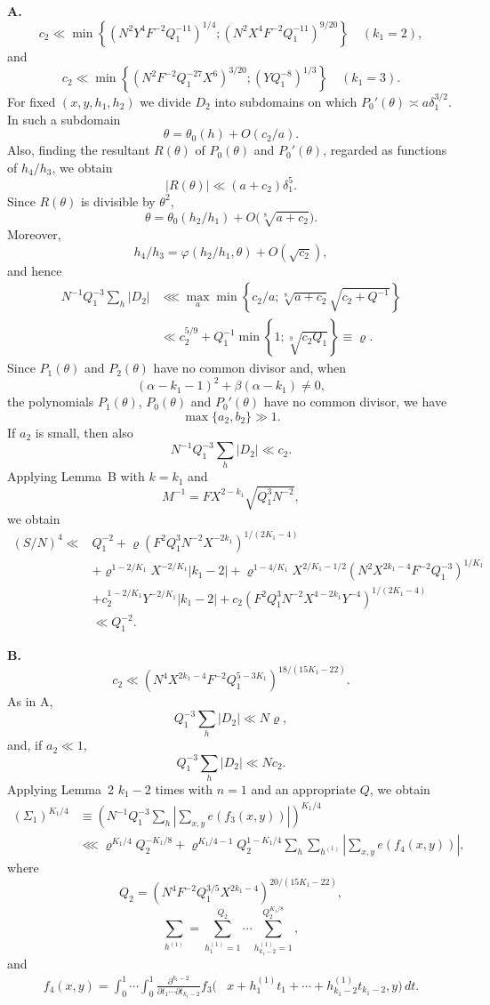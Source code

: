 \documentclass[10pt]{article}
\begin{document}
\medskip
\noindent\textbf{A.}
\[
 c_2\ll\min\left\{
 (N^2Y^4F^{-2}Q_1^{-11})^{1/4};
 (N^2X^4F^{-2}Q_1^{-11})^{9/20}
 \right\}\quad(k_1=2),
\]
and
\[
 c_2\ll\min\left\{
 (N^2F^{-2}Q_1^{-27}X^6)^{3/20};
 (YQ_1^{-8})^{1/3}
 \right\}\quad(k_1=3).
\]
For fixed $(x,y,h_1,h_2)$ we divide $D_2$ into subdomains on which
$P_0'(\theta)\asymp a\delta_1^{3/2}$. In such a subdomain
\[
  \theta=\theta_0(h)+O(c_2/a).
\]
Also, finding the resultant $R(\theta)$ of $P_0(\theta)$ and $P_0'(\theta)$, regarded as functions of $h_4/h_3$, we obtain
\[
  \lvert R(\theta)\rvert\ll(a+c_2)\delta_1^5.
\]
Since $R(\theta)$ is divisible by $\theta^2$,
\[
  \theta=\theta_0(h_2/h_1)+O\bigl(\sqrt[8]{a+c_2}\bigr).
\]
Moreover,
\[
  h_4/h_3=\varphi(h_2/h_1,\theta)+O(\sqrt{c_2}),
\]
and hence
\[
\begin{aligned}
N^{-1}Q_1^{-3}\sum_h\lvert D_2\rvert
&\lll \max_a\min\left\{
  c_2/a;
  \sqrt[8]{a+c_2}\sqrt{c_2+Q^{-1}}
 \right\}\\
&\ll c_2^{5/9}+Q_1^{-1}\min\left\{1;\sqrt[9]{c_2Q_1}\right\}
 \equiv\varrho.
\end{aligned}
\]
Since $P_1(\theta)$ and $P_2(\theta)$ have no common divisor and, when
\[
  (\alpha-k_1-1)^2+\beta(\alpha-k_1)\ne0,
\]
the polynomials $P_1(\theta)$, $P_0(\theta)$ and $P_0'(\theta)$ have no common divisor, we have
\[
  \max\{a_2,b_2\}\gg1.
\]
If $a_2$ is small, then also
\[
  N^{-1}Q_1^{-3}\sum_h\lvert D_2\rvert\ll c_2.
\]
Applying Lemma~B with $k=k_1$ and
\[
  M^{-1}=FX^{2-k_1}\sqrt{Q_1^3N^{-2}},
\]
we obtain
\[
\begin{aligned}
(S/N)^4\ll{}&Q_1^{-2}
+\varrho(F^2Q_1^3N^{-2}X^{-2k_1})^{1/(2K_1-4)}\\
&+\varrho^{1-2/K_1}X^{-2/K_1}\lvert k_1-2\rvert
+\varrho^{1-4/K_1}X^{2/K_1-1/2}
 (N^2X^{2k_1-4}F^{-2}Q_1^{-3})^{1/K_1}\\
&+c_2^{1-2/K_1}Y^{-2/K_1}\lvert k_1-2\rvert
+c_2(F^2Q_1^3N^{-2}X^{4-2k_1}Y^{-4})^{1/(2K_1-4)}\\
&\ll Q_1^{-2}.
\end{aligned}
\]

\medskip
\noindent\textbf{B.}
\[
  c_2\ll
  (N^4X^{2k_1-4}F^{-2}Q_1^{5-3K_1})^{18/(15K_1-22)}.
\]
As in A,
\[
  Q_1^{-3}\sum_h\lvert D_2\rvert\ll N\varrho,
\]
and, if $a_2\ll1$,
\[
  Q_1^{-3}\sum_h\lvert D_2\rvert\ll Nc_2.
\]
Applying Lemma~2 $k_1-2$ times with $n=1$ and an appropriate $Q$, we obtain
\[
\begin{aligned}
(\Sigma_1)^{K_1/4}
&\equiv\left(
 N^{-1}Q_1^{-3}\sum_h
 \left\lvert\sum_{x,y}e(f_3(x,y))\right\rvert
 \right)^{K_1/4}\\
&\lll \varrho^{K_1/4}Q_2^{-K_1/8}
 +\varrho^{K_1/4-1}Q_2^{1-K_1/4}
  \sum_h\sum_{h^{(1)}}
  \left\lvert\sum_{x,y}e(f_4(x,y))\right\rvert,
\end{aligned}
\]
where
\[
  Q_2=(N^4F^{-2}Q_1^{3/5}X^{2k_1-4})^{20/(15K_1-22)},
\]
\[
  \sum_{h^{(1)}}=
  \sum_{h_1^{(1)}=1}^{Q_2}\cdots
  \sum_{h_{k_1-2}^{(1)}=1}^{Q_2^{K_1/8}},
\]
and
\[
\begin{aligned}
 f_4(x,y)=\int_0^1\!\cdots\!\int_0^1
 \frac{\partial^{k_1-2}}{\partial t_1\cdots\partial t_{k_1-2}}
 f_3\bigl(&x+h_1^{(1)}t_1+\cdots
 +h_{k_1-2}^{(1)}t_{k_1-2},y\bigr)\,dt.
\end{aligned}
\]
\end{document}
